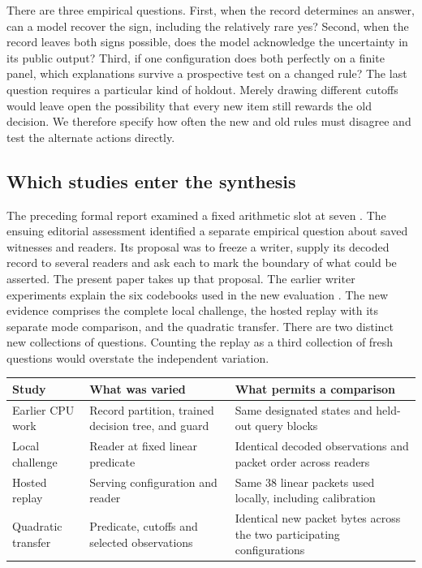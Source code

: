 \documentclass[12pt,letterpaper]{article}
\begin{document}
There are three empirical questions. First, when the record determines an answer, can a model recover the sign, including the relatively rare yes? Second, when the record leaves both signs possible, does the model acknowledge the uncertainty in its public output? Third, if one configuration does both perfectly on a finite panel, which explanations survive a prospective test on a changed rule? The last question requires a particular kind of holdout. Merely drawing different cutoffs would leave open the possibility that every new item still rewards the old decision. We therefore specify how often the new and old rules must disagree and test the alternate actions directly.

\subsection{Which studies enter the synthesis}
The preceding formal report examined a fixed arithmetic slot at seven \cite{slot}. The ensuing editorial assessment identified a separate empirical question about saved witnesses and readers. Its proposal was to freeze a writer, supply its decoded record to several readers and ask each to mark the boundary of what could be asserted. The present paper takes up that proposal. The earlier writer experiments explain the six codebooks used in the new evaluation \cite{witness}. The new evidence comprises the complete local challenge, the hosted replay with its separate mode comparison, and the quadratic transfer. There are two distinct new collections of questions. Counting the replay as a third collection of fresh questions would overstate the independent variation.

\begin{center}\small
\begin{tabularx}{\linewidth}{@{}>{\raggedright\arraybackslash}p{.18\linewidth}L>{\raggedright\arraybackslash}p{.31\linewidth}@{}}\toprule
Study & What was varied & What permits a comparison\\\midrule
Earlier CPU work & Record partition, trained decision tree, and guard & Same designated states and held-out query blocks\\
Local challenge & Reader at fixed linear predicate & Identical decoded observations and packet order across readers\\
Hosted replay & Serving configuration and reader & Same 38 linear packets used locally, including calibration\\
Quadratic transfer & Predicate, cutoffs and selected observations & Identical new packet bytes across the two participating configurations\\\bottomrule
\end{tabularx}
\end{center}
\end{document}
